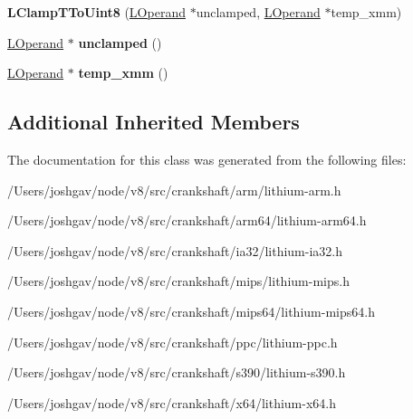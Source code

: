 \begin{DoxyCompactItemize}
\item 
{\bfseries L\+Clamp\+T\+To\+Uint8} (\hyperlink{classv8_1_1internal_1_1_l_operand}{L\+Operand} $\ast$unclamped, \hyperlink{classv8_1_1internal_1_1_l_operand}{L\+Operand} $\ast$temp\+\_\+xmm)\hypertarget{classv8_1_1internal_1_1_l_clamp_t_to_uint8_a74277c64cbdb50a2bac741ce28fffd60}{}\label{classv8_1_1internal_1_1_l_clamp_t_to_uint8_a74277c64cbdb50a2bac741ce28fffd60}

\item 
\hyperlink{classv8_1_1internal_1_1_l_operand}{L\+Operand} $\ast$ {\bfseries unclamped} ()\hypertarget{classv8_1_1internal_1_1_l_clamp_t_to_uint8_a8f506cfbca393e40525008142e17c30d}{}\label{classv8_1_1internal_1_1_l_clamp_t_to_uint8_a8f506cfbca393e40525008142e17c30d}

\item 
\hyperlink{classv8_1_1internal_1_1_l_operand}{L\+Operand} $\ast$ {\bfseries temp\+\_\+xmm} ()\hypertarget{classv8_1_1internal_1_1_l_clamp_t_to_uint8_a96b183dc064bf18b92df34ab2244f697}{}\label{classv8_1_1internal_1_1_l_clamp_t_to_uint8_a96b183dc064bf18b92df34ab2244f697}

\end{DoxyCompactItemize}
\subsection*{Additional Inherited Members}


The documentation for this class was generated from the following files\+:\begin{DoxyCompactItemize}
\item 
/\+Users/joshgav/node/v8/src/crankshaft/arm/lithium-\/arm.\+h\item 
/\+Users/joshgav/node/v8/src/crankshaft/arm64/lithium-\/arm64.\+h\item 
/\+Users/joshgav/node/v8/src/crankshaft/ia32/lithium-\/ia32.\+h\item 
/\+Users/joshgav/node/v8/src/crankshaft/mips/lithium-\/mips.\+h\item 
/\+Users/joshgav/node/v8/src/crankshaft/mips64/lithium-\/mips64.\+h\item 
/\+Users/joshgav/node/v8/src/crankshaft/ppc/lithium-\/ppc.\+h\item 
/\+Users/joshgav/node/v8/src/crankshaft/s390/lithium-\/s390.\+h\item 
/\+Users/joshgav/node/v8/src/crankshaft/x64/lithium-\/x64.\+h\end{DoxyCompactItemize}
